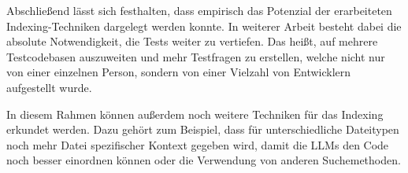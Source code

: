 \documentclass[../main.tex]{subfiles}
\begin{document}
Abschließend lässt sich festhalten, dass empirisch das Potenzial der erarbeiteten Indexing-Techniken dargelegt werden konnte.
In weiterer Arbeit besteht dabei die absolute Notwendigkeit, die Tests weiter zu vertiefen.
Das heißt, auf mehrere Testcodebasen auszuweiten und mehr Testfragen zu erstellen, welche nicht nur von einer einzelnen Person, sondern von einer Vielzahl von Entwicklern aufgestellt wurde.

In diesem Rahmen können außerdem noch weitere Techniken für das Indexing erkundet werden.
Dazu gehört zum Beispiel, dass für unterschiedliche Dateitypen noch mehr Datei spezifischer Kontext gegeben wird, damit die \glspl{LLM} den Code noch besser einordnen können oder die Verwendung von anderen Suchemethoden.
\end{document}
